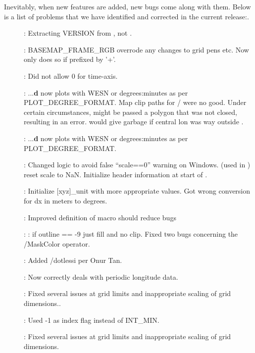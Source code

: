 Inevitably, when new features are added, new bugs come along with them.  Below is a list of problems
that we have identified and corrected in the current release:.

\begin{description}
\item []: Extracting VERSION from , not .
\item []: BASEMAP\_FRAME\_RGB overrode any changes to grid pens etc.  Now only
does so if prefixed by '+'.
\item []: Did not allow 0 for time-axis.
\item []: ...{\bf d} now plots with WESN or degrees:minutes as per PLOT\_DEGREE\_FORMAT.
Map clip paths for / were no good.  Under certain circumstances,  might be passed
a polygon that was not closed, resulting in an error.   would give garbage if central lon was way outside .
\item []: ...{\bf d} now plots with WESN or degrees:minutes as per PLOT\_DEGREE\_FORMAT.
\item []: Changed logic to avoid false ``scale==0'' warning on Windows.
 (used in ) reset scale to NaN.
Initialize header information at start of .
\item []: Initialize [xyz]\_unit with more appropriate values.
Got wrong conversion for dx in meters to degrees.
\item []: Improved definition of  macro should reduce bugs
\item []: : if outline == -9 just fill and no clip.
Fixed two bugs concerning the /MaskColor operator.
\item []: Added /dotlessi per Onur Tan.
\item []: Now correctly deals with periodic longitude data.
\item []: Fixed several issues at grid limits and inappropriate scaling of grid dimensions..
\item []: Used -1 as index flag instead of INT\_MIN.
\item []: Fixed several issues at grid limits and inappropriate scaling of grid dimensions.

\end{description}
